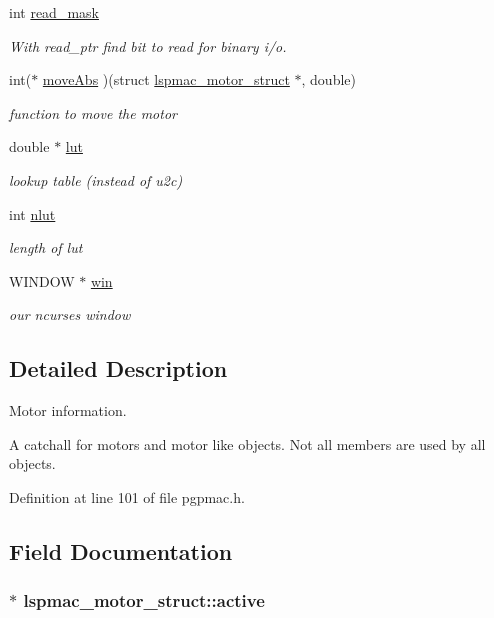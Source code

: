 \begin{DoxyCompactItemize}
int \hyperlink{structlspmac__motor__struct_a3c24ed30c5a3ad490c6139b2780b2af7}{read\-\_\-mask}
\begin{DoxyCompactList}\small\item\em With read\-\_\-ptr find bit to read for binary i/o. \end{DoxyCompactList}\item 
int($\ast$ \hyperlink{structlspmac__motor__struct_a38b6eee046c3ceff84f908af3335ebcf}{move\-Abs} )(struct \hyperlink{structlspmac__motor__struct}{lspmac\-\_\-motor\-\_\-struct} $\ast$, double)
\begin{DoxyCompactList}\small\item\em function to move the motor \end{DoxyCompactList}\item 
double $\ast$ \hyperlink{structlspmac__motor__struct_a7b43671f7f3e06521f6cf91fb9ac707d}{lut}
\begin{DoxyCompactList}\small\item\em lookup table (instead of u2c) \end{DoxyCompactList}\item 
int \hyperlink{structlspmac__motor__struct_a11cbc6f50c150ed446e9a901cf7cc12b}{nlut}
\begin{DoxyCompactList}\small\item\em length of lut \end{DoxyCompactList}\item 
W\-I\-N\-D\-O\-W $\ast$ \hyperlink{structlspmac__motor__struct_a133775154b0e008f3a2fde6f53bc0eff}{win}
\begin{DoxyCompactList}\small\item\em our ncurses window \end{DoxyCompactList}\end{DoxyCompactItemize}


\subsection{Detailed Description}
Motor information. 

A catchall for motors and motor like objects. Not all members are used by all objects. 

Definition at line 101 of file pgpmac.\-h.



\subsection{Field Documentation}
\hypertarget{structlspmac__motor__struct_aed4998885bcd5a2a30069637180f58e3}{
\subsubsection[{active}]{$\ast$ lspmac\-\_\-motor\-\_\-struct\-::active}}\label{structlspmac__motor__struct_aed4998885bcd5a2a30069637180f58e3}



